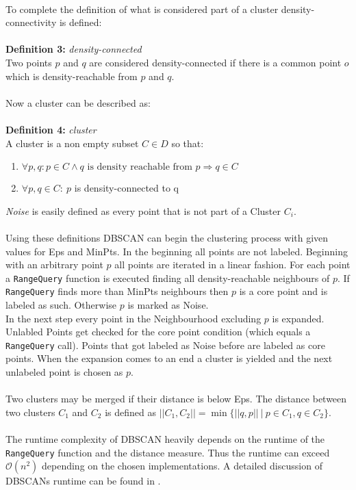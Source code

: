 \ \\
To complete the definition of what is considered part of a cluster density-connectivity is defined:\\
\ \\
\textbf{Definition 3:} \textit{density-connected}\\
Two points $p$ and $q$ are considered density-connected if there is a common point $o$ which is density-reachable from $p$ and $q$.\\
\ \\
Now a cluster can be described as:\\
\ \\
\textbf{Definition 4:} \textit{cluster}\\
A cluster is a non empty subset $C \in D$ so that:
\begin{enumerate}
    \item $\forall p, q: p \in C \wedge q \text{ is density reachable from } p \Rightarrow q \in C$
    \item $\forall p, q \in C: \ p$ is density-connected to q
\end{enumerate}
\textit{Noise} is easily defined as every point that is not part of a Cluster $C_i$.\\
\ \\
Using these definitions DBSCAN can begin the clustering process with given values for Eps and MinPts. In the beginning all points are not labeled. Beginning with an arbitrary point $p$ all points are iterated in a linear fashion. For each point a \texttt{RangeQuery} function is executed finding all density-reachable neighbours of $p$. If \texttt{RangeQuery} finds more than MinPts neighbours then $p$ is a core point and is labeled as such. Otherwise $p$ is marked as Noise.\\
In the next step every point in the Neighbourhood excluding $p$ is expanded. Unlabled Points get checked for the core point condition (which equals a \texttt{RangeQuery} call). Points that got labeled as Noise before are labeled as core points.
When the expansion comes to an end a cluster is yielded and the next unlabeled point is chosen as $p$.\\
\\
Two clusters may be merged if their distance is below Eps. The distance between two clusters $C_1$ and $C_2$ is defined as $||C_1, C_2|| = \min \{ ||q, p|| \ | \ p \in C_1, q \in C_2\}$.\\
\ \\
The runtime complexity of DBSCAN heavily depends on the runtime of the \texttt{RangeQuery} function and the distance measure. Thus the runtime can exceed $\mathcal{O}(n^2)$ depending on the chosen implementations. A detailed discussion of DBSCANs runtime can be found in \cite{dbscanrevisited}. 